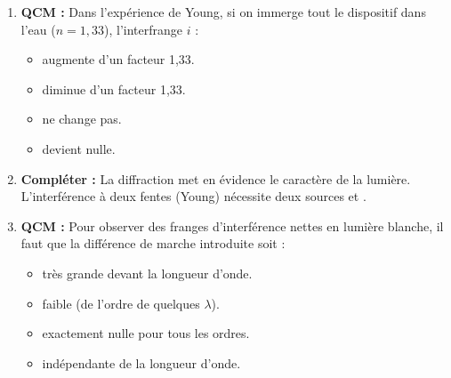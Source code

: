 \documentclass[11pt]{article}
\begin{document}
\begin{exercice}
\begin{enumerate}
    \item \textbf{QCM :} Dans l'expérience de Young, si on immerge tout le dispositif dans l'eau ($n=1,33$), l'interfrange $i$ :
    \begin{itemize}
        \item[A.] augmente d'un facteur 1,33.
        \item[B.] diminue d'un facteur 1,33.
        \item[C.] ne change pas.
        \item[D.] devient nulle.
    \end{itemize}
    \item \textbf{Compléter :} La diffraction met en évidence le caractère \underline{\hspace{3cm}} de la lumière. L'interférence à deux fentes (Young) nécessite deux sources \underline{\hspace{3cm}} et \underline{\hspace{3cm}}.
    \item \textbf{QCM :} Pour observer des franges d'interférence nettes en lumière blanche, il faut que la différence de marche introduite soit :
    \begin{itemize}
        \item[A.] très grande devant la longueur d'onde.
        \item[B.] faible (de l'ordre de quelques $\lambda$).
        \item[C.] exactement nulle pour tous les ordres.
        \item[D.] indépendante de la longueur d'onde.
    \end{itemize}
\end{enumerate}
\end{exercice}
\end{document}
